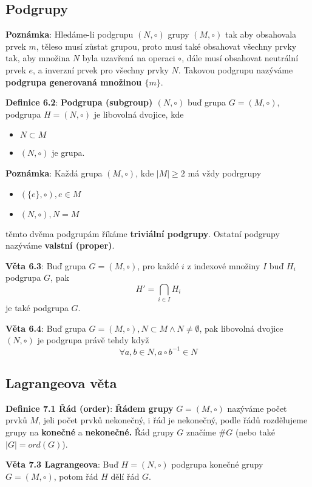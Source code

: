 \documentclass[12pt, letterpaper, twoside]{article}
\begin{document}
\subsection{Podgrupy}

\textbf{Poznámka}: Hledáme-li podgrupu $(N, \circ)$ grupy $(M, \circ)$ tak aby obsahovala prvek $m$,
 těleso musí zůstat grupou, proto musí také obsahovat všechny prvky tak, aby množina $N$ byla uzavřená na operaci $\circ$,
 dále musí obsahovat neutrální prvek $e$, a inverzní prvek pro všechny prvky $N$.
 Takovou podgrupu nazýváme \textbf{podgrupa generovaná množinou $\{m\}$}.

\textbf{Definice 6.2}: \textbf{Podgrupa (subgroup) $(N, \circ)$}
 buď grupa $G = (M, \circ)$, podgrupa $H = (N, \circ)$ je libovolná dvojice, kde
\begin{itemize}
    \item $N \subset M$
    \item $(N, \circ)$ je grupa.
\end{itemize}

\textbf{Poznámka}: Každá grupa $(M, \circ)$, kde $|M| \geq 2$ má vždy podrgrupy
\begin{itemize}
    \item $(\{e\}, \circ), e \in M$
    \item $(N, \circ), N = M$
\end{itemize}
těmto dvěma podgrupám říkáme \textbf{triviální podgrupy}. Ostatní podgrupy nazýváme \textbf{valstní (proper)}.

\textbf{Věta 6.3}: Buď grupa $G = (M, \circ)$, pro každé $i$ z indexové množiny $I$ buď $H_{i}$ podgrupa $G$, pak 
\[H' = \bigcap_{i \in I} H_i\] je také podgrupa $G$.

\textbf{Věta 6.4}: Buď grupa $G = (M, \circ), N \subset M \wedge N \neq \emptyset$,
 pak libovolná dvojice $(N, \circ)$ je podgrupa právě tehdy když
\[ \forall a,b \in N, a \circ b^{-1} \in N \]

\subsection{Lagrangeova věta}

\textbf{Definice 7.1 Řád (order)}: \textbf{Řádem grupy} $G = (M, \circ)$ nazýváme počet prvků $M$,
 jeli počet prvků nekonečný, i řád je nekonečný, podle řádů rozdělujeme grupy na \textbf{konečné} a \textbf{nekonečné.}
 Řád grupy $G$ značíme $\#G$ (nebo také $|G| = ord(G)$).

\textbf{Věta 7.3 Lagrangeova}: Buď $H = (N, \circ)$ podgrupa konečné grupy $G = (M, \circ)$, potom řád $H$ dělí řád $G$.
\end{document}

